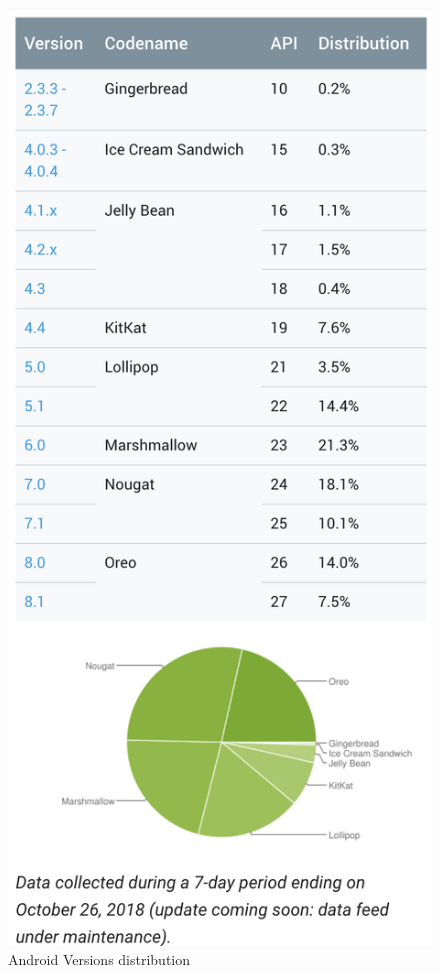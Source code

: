 \documentclass[thesis=B,english]{FITthesis}[2012/10/20]
\begin{document}
\begin{figure}[H]
\center
  \includegraphics[scale=0.5]{androidversions}
  \caption{Android Versions distribution}
  \label{fig:androidversions}
\end{figure}
\end{document}
